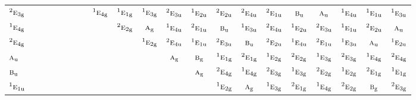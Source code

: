 \documentclass[10pt,a4paper]{article}
\numberwithin{equation}{section}
\newcommand{\irr}[1]{\text{\normalfont\scshape #1}}
\newcommand{\conjpair}[1]{{}^{#1}}
\newcommand{\ptag}[1]{\mathrm{#1}}
\begin{document}
{\begin{longtable}{@{}lcccccccccccccccccccc@{}}
$\conjpair{2}\irr{e}_{3\ptag{g}}$ &  &  &  &  &  &  &  & $\conjpair{1}\irr{e}_{4\ptag{g}}$ & $\conjpair{1}\irr{e}_{1\ptag{g}}$ & $\conjpair{1}\irr{e}_{3\ptag{g}}$ & $\conjpair{2}\irr{e}_{3\ptag{u}}$ & $\conjpair{1}\irr{e}_{2\ptag{u}}$ & $\conjpair{2}\irr{e}_{2\ptag{u}}$ & $\conjpair{2}\irr{e}_{4\ptag{u}}$ & $\conjpair{2}\irr{e}_{1\ptag{u}}$ & $\irr{b}_{\ptag{u}}$ & $\irr{a}_{\ptag{u}}$ & $\conjpair{1}\irr{e}_{4\ptag{u}}$ & $\conjpair{1}\irr{e}_{1\ptag{u}}$ & $\conjpair{1}\irr{e}_{3\ptag{u}}$\\
$\conjpair{1}\irr{e}_{4\ptag{g}}$ &  &  &  &  &  &  &  &  & $\conjpair{2}\irr{e}_{2\ptag{g}}$ & $\irr{a}_{\ptag{g}}$ & $\conjpair{1}\irr{e}_{4\ptag{u}}$ & $\conjpair{2}\irr{e}_{1\ptag{u}}$ & $\irr{b}_{\ptag{u}}$ & $\conjpair{1}\irr{e}_{3\ptag{u}}$ & $\conjpair{2}\irr{e}_{4\ptag{u}}$ & $\conjpair{1}\irr{e}_{2\ptag{u}}$ & $\conjpair{2}\irr{e}_{3\ptag{u}}$ & $\conjpair{1}\irr{e}_{1\ptag{u}}$ & $\conjpair{2}\irr{e}_{2\ptag{u}}$ & $\irr{a}_{\ptag{u}}$\\
$\conjpair{2}\irr{e}_{4\ptag{g}}$ &  &  &  &  &  &  &  &  &  & $\conjpair{1}\irr{e}_{2\ptag{g}}$ & $\conjpair{2}\irr{e}_{4\ptag{u}}$ & $\conjpair{1}\irr{e}_{1\ptag{u}}$ & $\conjpair{2}\irr{e}_{3\ptag{u}}$ & $\irr{b}_{\ptag{u}}$ & $\conjpair{2}\irr{e}_{2\ptag{u}}$ & $\conjpair{1}\irr{e}_{4\ptag{u}}$ & $\conjpair{2}\irr{e}_{1\ptag{u}}$ & $\conjpair{1}\irr{e}_{3\ptag{u}}$ & $\irr{a}_{\ptag{u}}$ & $\conjpair{1}\irr{e}_{2\ptag{u}}$\\
$\irr{a}_{\ptag{u}}$ &  &  &  &  &  &  &  &  &  &  & $\irr{a}_{\ptag{g}}$ & $\irr{b}_{\ptag{g}}$ & $\conjpair{1}\irr{e}_{1\ptag{g}}$ & $\conjpair{2}\irr{e}_{1\ptag{g}}$ & $\conjpair{1}\irr{e}_{2\ptag{g}}$ & $\conjpair{2}\irr{e}_{2\ptag{g}}$ & $\conjpair{1}\irr{e}_{3\ptag{g}}$ & $\conjpair{2}\irr{e}_{3\ptag{g}}$ & $\conjpair{1}\irr{e}_{4\ptag{g}}$ & $\conjpair{2}\irr{e}_{4\ptag{g}}$\\
$\irr{b}_{\ptag{u}}$ &  &  &  &  &  &  &  &  &  &  &  & $\irr{a}_{\ptag{g}}$ & $\conjpair{2}\irr{e}_{4\ptag{g}}$ & $\conjpair{1}\irr{e}_{4\ptag{g}}$ & $\conjpair{2}\irr{e}_{3\ptag{g}}$ & $\conjpair{1}\irr{e}_{3\ptag{g}}$ & $\conjpair{2}\irr{e}_{2\ptag{g}}$ & $\conjpair{1}\irr{e}_{2\ptag{g}}$ & $\conjpair{2}\irr{e}_{1\ptag{g}}$ & $\conjpair{1}\irr{e}_{1\ptag{g}}$\\
$\conjpair{1}\irr{e}_{1\ptag{u}}$ &  &  &  &  &  &  &  &  &  &  &  &  & $\conjpair{1}\irr{e}_{2\ptag{g}}$ & $\irr{a}_{\ptag{g}}$ & $\conjpair{1}\irr{e}_{3\ptag{g}}$ & $\conjpair{2}\irr{e}_{1\ptag{g}}$ & $\conjpair{1}\irr{e}_{4\ptag{g}}$ & $\conjpair{2}\irr{e}_{2\ptag{g}}$ & $\irr{b}_{\ptag{g}}$ & $\conjpair{2}\irr{e}_{3\ptag{g}}$\\

\end{longtable}}
\end{document}

